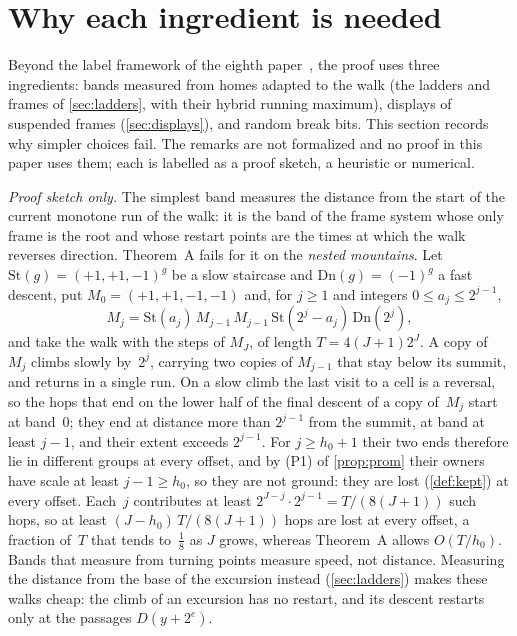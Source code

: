 \section{Why each ingredient is needed}\label{sec:ingredients}

Beyond the label framework of the eighth paper~\cite{EighthPaper2026}, the proof uses three ingredients: bands measured from
homes adapted to the walk (the ladders and frames of \cref{sec:ladders}, with their hybrid running maximum), displays of
suspended frames (\cref{sec:displays}), and random break bits. This section records why simpler choices fail. The remarks are
not formalized and no proof in this paper uses them; each is labelled as a proof sketch, a heuristic or numerical.

\begin{remark}\label{rem:runstart}
\emph{Proof sketch only.} The simplest band measures the distance from the start of the current monotone run of the walk: it is
the band of the frame system whose only frame is the root and whose restart points are the times at which the walk reverses
direction. Theorem~A fails for it on the \emph{nested mountains}. Let $\mathrm{St}(g)=(+1,+1,-1)^g$ be a slow staircase and
$\mathrm{Dn}(g)=(-1)^g$ a fast descent, put $M_0=(+1,+1,-1,-1)$ and, for $j\ge1$ and integers $0\le a_j\le2^{j-1}$,
\[
  M_j=\mathrm{St}(a_j)\,M_{j-1}\,M_{j-1}\,\mathrm{St}(2^j-a_j)\,\mathrm{Dn}(2^j),
\]
and take the walk with the steps of $M_J$, of length $T=4(J+1)2^J$. A copy of~$M_j$ climbs slowly by~$2^j$, carrying two copies
of $M_{j-1}$ that stay below its summit, and returns in a single run. On a slow climb the last visit to a cell is a reversal, so
the hops that end on the lower half of the final descent of a copy of~$M_j$ start at band~$0$; they end at distance more than
$2^{j-1}$ from the summit, at band at least $j-1$, and their extent exceeds $2^{j-1}$. For $j\ge h_0+1$ their two ends therefore
lie in different groups at every offset, and by (P1) of \cref{prop:prom} their owners have scale at least $j-1\ge h_0$, so they
are not ground: they are lost (\cref{def:kept}) at every offset. Each~$j$ contributes at least $2^{J-j}\cdot2^{j-1}=T/(8(J+1))$
such hops, so at least $(J-h_0)\,T/(8(J+1))$ hops are lost at every offset, a fraction of~$T$ that tends to~$\frac18$ as $J$
grows, whereas Theorem~A allows $O(T/h_0)$. Bands that measure from turning points measure speed, not distance. Measuring the
distance from the base of the excursion instead (\cref{sec:ladders}) makes these walks cheap: the climb of an excursion has no
restart, and its descent restarts only at the passages $D(y+2^e)$.
\end{remark}

